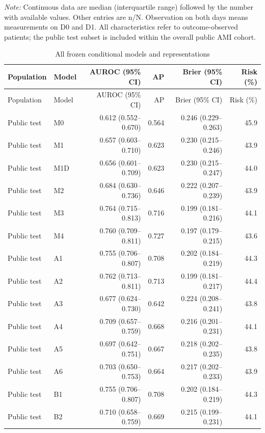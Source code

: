 \documentclass[pdflatex,sn-vancouver-num]{sn-jnl}
\begin{document}
\noindent\textit{Note:} Continuous data are median (interquartile range) followed by the number with available values. Other entries are n/N. Observation on both days means measurements on D0 and D1. All characteristics refer to outcome-observed patients; the public test subset is included within the overall public AMI cohort.\par\endgroup
\begingroup\scriptsize\setlength{\tabcolsep}{2pt}
\begin{longtable}{llrrrr}
\caption{All frozen conditional models and representations}\label{tab:s4}\\
\toprule
Population & Model & AUROC (95\% CI) & AP & Brier (95\% CI) & Risk (\%)\\\midrule
\endfirsthead
\toprule
Population & Model & AUROC (95\% CI) & AP & Brier (95\% CI) & Risk (\%)\\\midrule
\endhead
\endfoot
\bottomrule\endlastfoot
Public test & M0 & 0.612 (0.552--0.670) & 0.564 & 0.246 (0.229--0.263) & 45.9\\
Public test & M1 & 0.657 (0.603--0.710) & 0.623 & 0.230 (0.215--0.246) & 43.9\\
Public test & M1D & 0.656 (0.601--0.709) & 0.623 & 0.230 (0.215--0.247) & 44.0\\
Public test & M2 & 0.684 (0.630--0.736) & 0.646 & 0.222 (0.207--0.239) & 43.9\\
Public test & M3 & 0.764 (0.715--0.813) & 0.716 & 0.199 (0.181--0.216) & 44.1\\
Public test & M4 & 0.760 (0.709--0.811) & 0.727 & 0.197 (0.179--0.215) & 43.6\\
Public test & A1 & 0.755 (0.706--0.807) & 0.708 & 0.202 (0.184--0.219) & 44.3\\
Public test & A2 & 0.762 (0.713--0.811) & 0.713 & 0.199 (0.181--0.217) & 44.4\\
Public test & A3 & 0.677 (0.624--0.730) & 0.642 & 0.224 (0.208--0.241) & 43.8\\
Public test & A4 & 0.709 (0.657--0.759) & 0.668 & 0.216 (0.201--0.231) & 44.1\\
Public test & A5 & 0.697 (0.642--0.751) & 0.667 & 0.218 (0.202--0.235) & 43.8\\
Public test & A6 & 0.703 (0.650--0.753) & 0.664 & 0.217 (0.202--0.233) & 43.9\\
Public test & B1 & 0.755 (0.706--0.807) & 0.708 & 0.202 (0.184--0.219) & 44.3\\
Public test & B2 & 0.710 (0.658--0.759) & 0.669 & 0.215 (0.199--0.231) & 44.1\\

\end{longtable}
\end{document}

